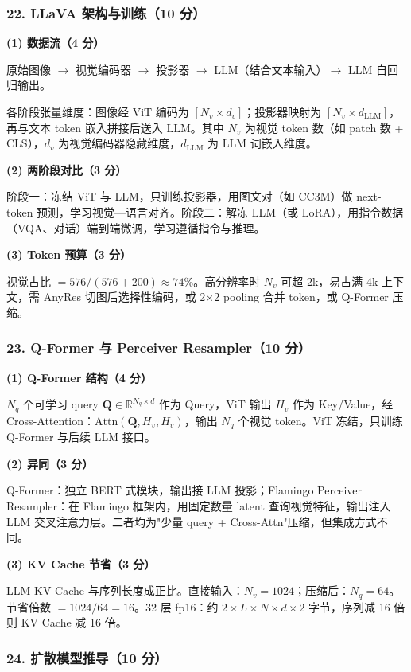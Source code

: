 \documentclass[11pt,a4paper]{article}
\begin{document}
\subsubsection*{22. LLaVA 架构与训练（10 分）}

\noindent\textbf{(1) 数据流（4 分）}

原始图像 $\to$ 视觉编码器 $\to$ 投影器 $\to$ LLM（结合文本输入）$\to$ LLM 自回归输出。

各阶段张量维度：图像经 ViT 编码为 $[N_v\times d_v]$；投影器映射为 $[N_v\times d_{\text{LLM}}]$，再与文本 token 嵌入拼接后送入 LLM。其中 $N_v$ 为视觉 token 数（如 patch 数 + CLS），$d_v$ 为视觉编码器隐藏维度，$d_{\text{LLM}}$ 为 LLM 词嵌入维度。

\noindent\textbf{(2) 两阶段对比（3 分）}

阶段一：冻结 ViT 与 LLM，只训练投影器，用图文对（如 CC3M）做 next-token 预测，学习视觉—语言对齐。阶段二：解冻 LLM（或 LoRA），用指令数据（VQA、对话）端到端微调，学习遵循指令与推理。

\noindent\textbf{(3) Token 预算（3 分）}

视觉占比 $=576/(576+200)\approx 74\%$。高分辨率时 $N_v$ 可超 2k，易占满 4k 上下文，需 AnyRes 切图后选择性编码，或 2$\times$2 pooling 合并 token，或 Q-Former 压缩。

\subsubsection*{23. Q-Former 与 Perceiver Resampler（10 分）}

\noindent\textbf{(1) Q-Former 结构（4 分）}

$N_q$ 个可学习 query $\mathbf{Q}\in\mathbb{R}^{N_q\times d}$ 作为 Query，ViT 输出 $H_v$ 作为 Key/Value，经 Cross-Attention：$\text{Attn}(\mathbf{Q},H_v,H_v)$，输出 $N_q$ 个视觉 token。ViT 冻结，只训练 Q-Former 与后续 LLM 接口。

\noindent\textbf{(2) 异同（3 分）}

Q-Former：独立 BERT 式模块，输出接 LLM 投影；Flamingo Perceiver Resampler：在 Flamingo 框架内，用固定数量 latent 查询视觉特征，输出注入 LLM 交叉注意力层。二者均为"少量 query + Cross-Attn"压缩，但集成方式不同。

\noindent\textbf{(3) KV Cache 节省（3 分）}

LLM KV Cache 与序列长度成正比。直接输入：$N_v=1024$；压缩后：$N_q=64$。节省倍数 $=1024/64=16$。32 层 fp16：约 $2\times L\times N\times d\times 2$ 字节，序列减 16 倍则 KV Cache 减 16 倍。


\subsubsection*{24. 扩散模型推导（10 分）}
\end{document}
